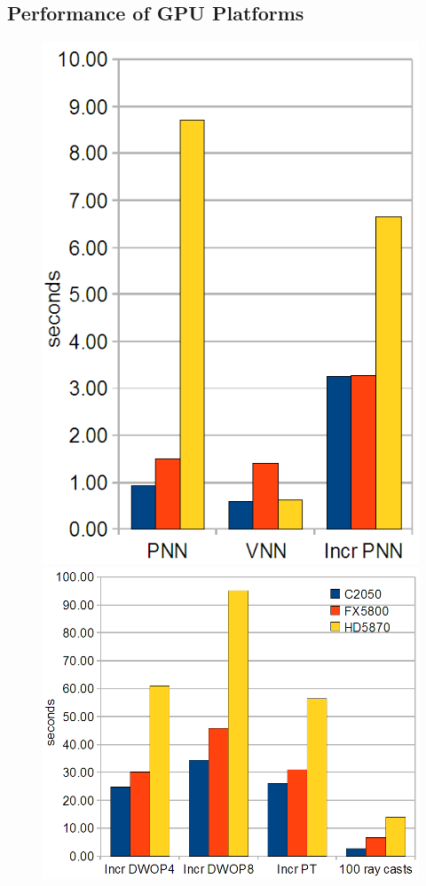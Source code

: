 \subsection{Performance of GPU Platforms}

	\begin{figure}[h]
	\centering
	\includegraphics[height=0.33\textheight]{charts/platforms_performance_1.png}
	\includegraphics[height=0.33\textheight]{charts/platforms_performance_2.png}

\end{figure}
